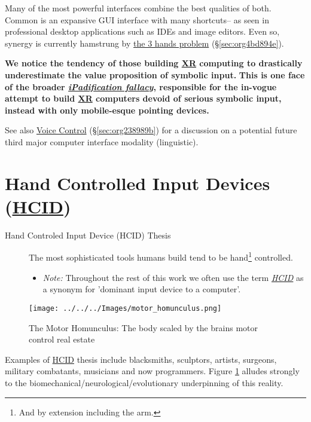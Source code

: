 \documentclass[logo,bsc,singlespacing,parskip]{infthesis}
\begin{document}
Many of the most powerful interfaces combine the best qualities of both.
Common is an expansive GUI interface with many shortcuts-- as seen in professional desktop applications such as IDEs and image editors.
Even so, synergy is currently hamstrung by \hyperref[sec:org4bd894e]{the 3 hands problem} (\S \ref{sec:org4bd894e}).

\textbf{We notice the tendency of those building \hyperref[org39cbd51]{XR} computing to drastically underestimate the value proposition of symbolic input.}
\textbf{This is one face of the broader \emph{\hyperref[ipadification fallacy]{iPadification fallacy}}, responsible for the in-vogue attempt to build \hyperref[org39cbd51]{XR} computers devoid of serious symbolic input, instead with only mobile-esque pointing devices.}

See also \hyperref[sec:org238989b]{Voice Control} (\S \ref{sec:org238989b}) for a discussion on a potential future third major computer interface modality (linguistic).

\section{Hand Controlled Input Devices (\hyperref[org0c83164]{HCID})}
\label{sec:org4ee11b2}
\begin{mdframed}
\begin{description}
\item[{Hand Controled Input Device (\label{org0c83164}HCID) Thesis}] The most sophisticated tools humans build tend to be hand\footnote{And by extension including the arm.} controlled.
\begin{itemize}
\item \emph{Note:} Throughout the rest of this work we often use the term \emph{\hyperref[org0c83164]{HCID}} as a synonym for 'dominant input device to a computer'.
\end{itemize}
\end{description}
\end{mdframed}

\begin{figure}[h]
\centering
\texttt{[image: ../../../Images/motor\_homunculus.png]}
\caption{\label{fig:motohomo}The Motor Homunculus: The body scaled by the brains motor control real estate}
\end{figure}

Examples of \hyperref[org0c83164]{HCID} thesis include blacksmiths, sculptors, artists, surgeons, military combatants, musicians and now programmers.
Figure \ref{fig:motohomo} alludes strongly to the biomechanical/neurological/evolutionary underpinning of this reality.
\end{document}
